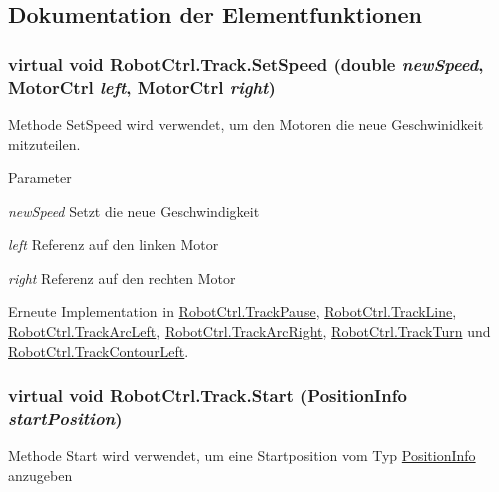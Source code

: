 \subsection{Dokumentation der Elementfunktionen}
\hypertarget{class_robot_ctrl_1_1_track_a9abc3ccf4bf1d9db8d461f2cb4b4b0d3}{
\subsubsection[{SetSpeed}]{\setlength{\rightskip}{0pt plus 5cm}virtual void RobotCtrl.Track.SetSpeed (double {\em newSpeed}, \/  {\bf MotorCtrl} {\em left}, \/  {\bf MotorCtrl} {\em right})}}
\label{class_robot_ctrl_1_1_track_a9abc3ccf4bf1d9db8d461f2cb4b4b0d3}
Methode SetSpeed wird verwendet, um den Motoren die neue Geschwinidkeit mitzuteilen.


\begin{DoxyParams}{Parameter}
\item[{\em newSpeed}]Setzt die neue Geschwindigkeit \item[{\em left}]Referenz auf den linken Motor \item[{\em right}]Referenz auf den rechten Motor \end{DoxyParams}


Erneute Implementation in \hyperlink{class_robot_ctrl_1_1_track_pause_a47133c69e455aa2c04f1bc3a6b5999b6}{RobotCtrl.TrackPause}, \hyperlink{class_robot_ctrl_1_1_track_line_ad73ae0e8f7aea1765834ab90f5bd6b23}{RobotCtrl.TrackLine}, \hyperlink{class_robot_ctrl_1_1_track_arc_left_aee8e8c1da176807436c2946e39bbd6ae}{RobotCtrl.TrackArcLeft}, \hyperlink{class_robot_ctrl_1_1_track_arc_right_a7b2db0d3709e4919da0645a6713a87bb}{RobotCtrl.TrackArcRight}, \hyperlink{class_robot_ctrl_1_1_track_turn_a065e23cd313e746cb65496c9b9df0955}{RobotCtrl.TrackTurn} und \hyperlink{class_robot_ctrl_1_1_track_contour_left_ae7938250af614625cd08a498c0f15195}{RobotCtrl.TrackContourLeft}.

\hypertarget{class_robot_ctrl_1_1_track_a91c0b372e1c332ae1aa18368df116633}{
\subsubsection[{Start}]{\setlength{\rightskip}{0pt plus 5cm}virtual void RobotCtrl.Track.Start ({\bf PositionInfo} {\em startPosition})}}
\label{class_robot_ctrl_1_1_track_a91c0b372e1c332ae1aa18368df116633}
Methode Start wird verwendet, um eine Startposition vom Typ \hyperlink{struct_robot_ctrl_1_1_position_info}{PositionInfo} anzugeben


